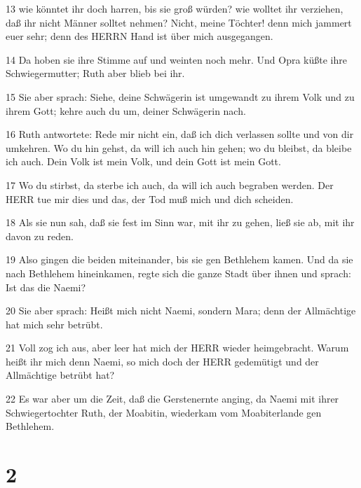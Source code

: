 \par 13 wie könntet ihr doch harren, bis sie groß würden? wie wolltet ihr verziehen, daß ihr nicht Männer solltet nehmen? Nicht, meine Töchter! denn mich jammert euer sehr; denn des HERRN Hand ist über mich ausgegangen.
\par 14 Da hoben sie ihre Stimme auf und weinten noch mehr. Und Opra küßte ihre Schwiegermutter; Ruth aber blieb bei ihr.
\par 15 Sie aber sprach: Siehe, deine Schwägerin ist umgewandt zu ihrem Volk und zu ihrem Gott; kehre auch du um, deiner Schwägerin nach.
\par 16 Ruth antwortete: Rede mir nicht ein, daß ich dich verlassen sollte und von dir umkehren. Wo du hin gehst, da will ich auch hin gehen; wo du bleibst, da bleibe ich auch. Dein Volk ist mein Volk, und dein Gott ist mein Gott.
\par 17 Wo du stirbst, da sterbe ich auch, da will ich auch begraben werden. Der HERR tue mir dies und das, der Tod muß mich und dich scheiden.
\par 18 Als sie nun sah, daß sie fest im Sinn war, mit ihr zu gehen, ließ sie ab, mit ihr davon zu reden.
\par 19 Also gingen die beiden miteinander, bis sie gen Bethlehem kamen. Und da sie nach Bethlehem hineinkamen, regte sich die ganze Stadt über ihnen und sprach: Ist das die Naemi?
\par 20 Sie aber sprach: Heißt mich nicht Naemi, sondern Mara; denn der Allmächtige hat mich sehr betrübt.
\par 21 Voll zog ich aus, aber leer hat mich der HERR wieder heimgebracht. Warum heißt ihr mich denn Naemi, so mich doch der HERR gedemütigt und der Allmächtige betrübt hat?
\par 22 Es war aber um die Zeit, daß die Gerstenernte anging, da Naemi mit ihrer Schwiegertochter Ruth, der Moabitin, wiederkam vom Moabiterlande gen Bethlehem.

\chapter{2}

